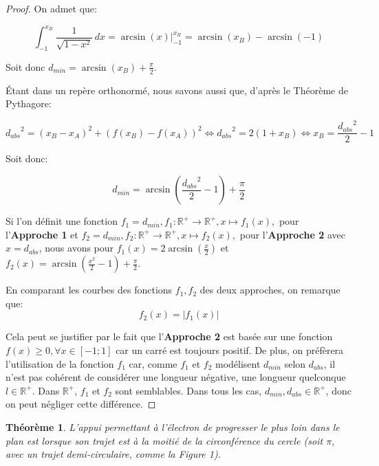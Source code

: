 \documentclass[a4paper]{amsart}
\newtheorem{theorem}{Théorème}[section]
\theoremstyle{definition}
\theoremstyle{remark}
\numberwithin{equation}{section}
\begin{document}
\begin{proof}
  On admet que:

  \[\int_{-1}^{x_B} \frac{1}{\sqrt{1-x^2}}\,dx=\arcsin (x)\Biggr|_{-1}^{x_B}=\arcsin (x_B)-\arcsin (-1)\]

  Soit donc $d_{min}=\arcsin (x_B)+\frac{\pi}{2}$.

  Étant dans un repère orthonormé, nous savons aussi que, d'après le Théorème de Pythagore:

  \[{d_{abs}}^2=(x_B-x_A)^2+(f(x_B)-f(x_A))^2 \Leftrightarrow {d_{abs}}^2=2(1+x_B) \Leftrightarrow x_B=\frac{{d_{abs}}^2}{2}-1\]

  Soit donc:

  \[d_{min}=\arcsin (\frac{{d_{abs}}^2}{2}-1)+\frac{\pi}{2}\]

  Si l'on définit une fonction $f_1=d_{min}, f_1:\mathbb{R^+}\longrightarrow \mathbb{R^+}, x\longmapsto f_1(x),$ pour l'\textbf{Approche 1} et $f_2=d_{min}, f_2:\mathbb{R^+}\longrightarrow \mathbb{R^+}, x\longmapsto f_2(x),$ pour l'\textbf{Approche 2} avec $x=d_{abs}$, nous avons pour $f_1(x)=2\arcsin (\frac{x}{2})$ et $f_2(x)=\arcsin (\frac{x^2}{2}-1)+\frac{\pi}{2}$.

  En comparant les courbes des fonctions $f_1,f_2$ des deux approches, on remarque que: \[f_2(x)=\lvert f_1(x) \rvert\]

  Cela peut se justifier par le fait que l'\textbf{Approche 2} est basée sur une fonction $f(x)\geq0, \forall x\in[-1;1]$ car un carré est toujours positif. De plus, on préfèrera l'utilisation de la fonction $f_1$ car, comme $f_1$ et $f_2$
  modélisent $d_{min}$ selon $d_{abs}$, il n'est pas cohérent de considérer une longueur négative, une longueur quelconque $l\in\mathbb{R^+}$. Dans $\mathbb{R^+}$, $f_1$ et $f_2$ sont semblables. Dans tous les cas, $d_{min},d_{abs}\in\mathbb{R^+}$, donc on peut négliger cette différence.
\end{proof}

\begin{theorem}
  L'appui permettant à l'électron de progresser le plus loin dans le plan est lorsque son trajet est à la moitié de la circonférence du cercle (soit $\pi$, avec un trajet demi-circulaire, comme la Figure 1).
\end{theorem}
\end{document}
